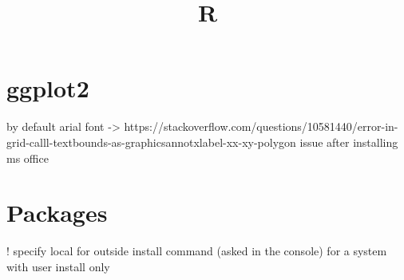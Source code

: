 


\title{R}


\date{}


\maketitle

\justify

\renewcommand{\abstractname}{}

\begin{abstract}

\end{abstract}


\section*{ggplot2}

by default arial font -> https://stackoverflow.com/questions/10581440/error-in-grid-calll-textbounds-as-graphicsannotxlabel-xx-xy-polygon
issue after installing ms office

\section*{Packages}

! specify local for outside install command (asked in the console) for a system with user install only





%
%



